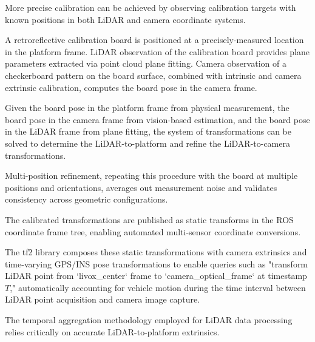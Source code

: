 \documentclass{erauthesis}
\begin{document}

More precise calibration can be achieved by observing calibration targets with known positions in both LiDAR and camera coordinate systems.

A retroreflective calibration board is positioned at a precisely-measured location in the platform frame.
LiDAR observation of the calibration board provides plane parameters extracted via point cloud plane fitting.
Camera observation of a checkerboard pattern on the board surface, combined with intrinsic and camera extrinsic calibration, computes the board pose in the camera frame.

Given the board pose in the platform frame from physical measurement, the board pose in the camera frame from vision-based estimation, and the board pose in the LiDAR frame from plane fitting, the system of transformations can be solved to determine the LiDAR-to-platform and refine the LiDAR-to-camera transformations.

Multi-position refinement, repeating this procedure with the board at multiple positions and orientations, averages out measurement noise and validates consistency across geometric configurations.


The calibrated transformations are published as static transforms in the ROS coordinate frame tree, enabling automated multi-sensor coordinate conversions.


The tf2 library composes these static transformations with camera extrinsics and time-varying GPS/INS pose transformations to enable queries such as "transform LiDAR point from `livox\_center` frame to `camera\_optical\_frame` at timestamp $T$," automatically accounting for vehicle motion during the time interval between LiDAR point acquisition and camera image capture.


The temporal aggregation methodology employed for LiDAR data processing relies critically on accurate LiDAR-to-platform extrinsics.
\end{document}
